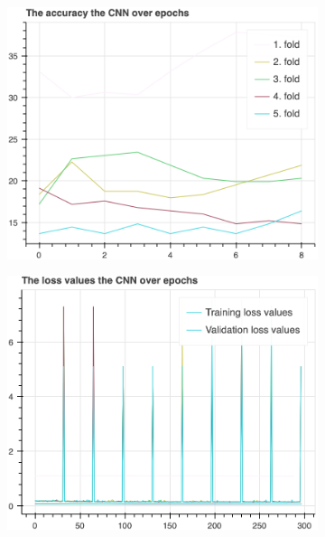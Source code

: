 		\begin{figure}[H]\ContinuedFloat
			\begin{subfigure}[b]{0.49\textwidth}
				\centering
				\includegraphics[width=\textwidth]{img/CNN_accuracy.png}
			\end{subfigure}
			\hfill
			\begin{subfigure}[b]{0.49\textwidth}
				\centering
				\includegraphics[width=\textwidth]{img/CNN_loss_values.png}
			\end{subfigure}
			\hfill
			\begin{subfigure}[b]{0.49\textwidth}

\end{subfigure}
\end{figure}
